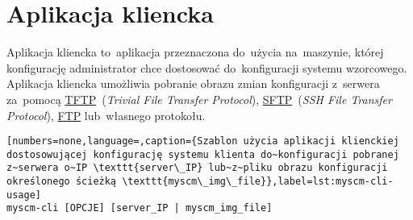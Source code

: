 \documentclass[thesis]{subfiles}
\begin{document}


\section{Aplikacja kliencka}

\newcommand{\cliappname}{myscm-cli}
\newcommand{\myscmcliconfig}{\path{/etc/myscm-cli/myscm-cli.conf}}

Aplikacja kliencka to~aplikacja przeznaczona do~użycia na~maszynie, której konfigurację administrator chce dostosować do~konfiguracji systemu wzorcowego. Aplikacja kliencka umożliwia pobranie obrazu zmian konfiguracji z~serwera za~pomocą \href{https://en.wikipedia.org/wiki/Trivial_File_Transfer_Protocol}{TFTP}~(\emph{Trivial File Transfer Protocol}), \href{https://en.wikipedia.org/wiki/SSH_File_Transfer_Protocol}{SFTP}~(\emph{SSH File Transfer Protocol}), \href{https://en.wikipedia.org/wiki/File_Transfer_Protocol}{FTP} lub~własnego protokołu.

\begin{lstlisting}[numbers=none,language=,caption={Szablon użycia aplikacji klienckiej dostosowującej konfigurację systemu klienta do~konfiguracji pobranej z~serwera o~IP \texttt{server\_IP} lub~z~pliku obrazu konfiguracji określonego ścieżką \texttt{myscm\_img\_file}},label=lst:myscm-cli-usage]
myscm-cli [OPCJE] [server_IP | myscm_img_file]
\end{lstlisting}
\end{document}
